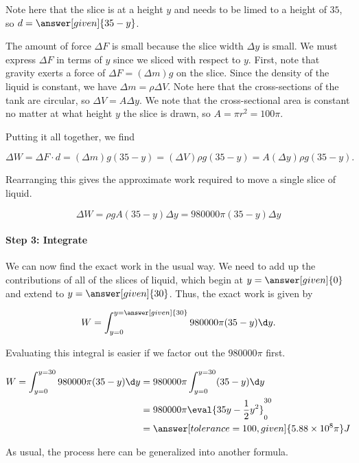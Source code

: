 \documentclass{ximera}
\begin{document}
\begin{model}
\begin{explanation}
Note here that the slice is at a height $y$ and needs to be limed to a height of $35$, so $d=\answer[given]{35-y}$.  

The amount of force $\Delta F$ is small because the slice width $\Delta y$ is small.  We must express $\Delta F$ in terms of $y$ since we sliced with respect to $y$.  First, note that gravity exerts a force of $\Delta F = (\Delta m) g $ on the slice.  Since the density of the liquid is constant, we have $\Delta m = \rho \Delta V$.  Note here that the cross-sections of the tank are circular, so $\Delta V = A \Delta y$.  We note that the cross-sectional area is constant no matter at what height $y$ the slice is drawn, so $A = \pi r^2 = 100 \pi$.

Putting it all together, we find

\[ \Delta W = \Delta F \cdot d = (\Delta m) g (35-y) = (\Delta V) \rho g (35-y) = A (\Delta y) \rho g (35-y) . \]

Rearranging this gives the approximate work required to move a single slice of liquid.

\[
\Delta W = \rho g A (35-y) \Delta y = 980000 \pi (35-y) \Delta y
\]

\paragraph{Step 3: Integrate} 

We can now find the exact work in the usual way.  We need to add up the contributions of all of the slices of liquid, which begin at $y=\answer[given]{0}$ and extend to $y=\answer[given]{30}$.  Thus, the exact work is given by

\[ W = \int_{y=0}^{y= \answer[given]{30}} 980000\pi(35-y) \d y. \]

Evaluating this integral is easier if we factor out the $980000\pi$ first.

\begin{align*}
W = \int_{y=0}^{y= 30} 980000\pi(35-y) \d y &= 980000\pi  \int_{y=0}^{y= 30} (35-y) \d y\\
&= 980000\pi \eval{35y-\frac{1}{2}y^2}_0^{30} \\
&= \answer[tolerance=100,given]{ 5.88 \times 10^8 \pi} J
\end{align*}
\end{explanation}

\end{model}

As usual, the process here can be generalized into another formula.  
\end{document}
